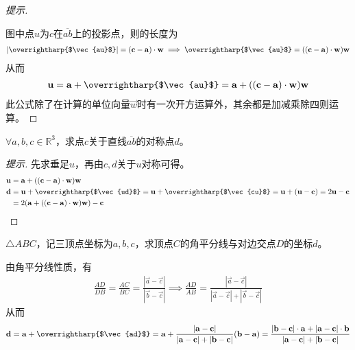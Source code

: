 \begin{proof}[提示]
\begin{center}
  \end{center}
  图中点$u$为$c$在$\overline{ab}$上的投影点，则的长度为
  \begin{align*}
    \left|\text{\overrightharp{$\vec{au}$}}\right| = (\vec c - \vec a)\cdot \vec w \implies
    \text{\overrightharp{$\vec{au}$}} = ((\vec c - \vec a)\cdot \vec w) \vec w
  \end{align*}
  从而
  \begin{align*}
    \vec u = \vec a + \text{\overrightharp{$\vec{au}$}} = \vec a + ((\vec c -\vec a)\cdot \vec w) \vec w
  \end{align*}
  此公式除了在计算的单位向量$\vec w$时有一次开方运算外，其余都是加减乘除四则运算。
\end{proof}


\begin{example}
  $\forall a, b, c\in\mathbb{R}^3$，求点$c$关于直线$\overline{ab}$的对称点$d$。
\end{example}
\begin{proof}[提示]
  先求垂足$u$，再由$c,d$关于$u$对称可得。
  \begin{align*}
    \vec u ={}& \vec a + ((\vec c -\vec a)\cdot \vec w) \vec w\\
    \vec d ={}& \vec u + \text{\overrightharp{$\vec{ud}$}} = \vec u + \text{\overrightharp{$\vec{cu}$}} = \vec u + (\vec u - \vec c) = 2\vec u - \vec c\\
           ={}& 2(\vec a + ((\vec c -\vec a)\cdot \vec w) \vec w) - \vec c \qedhere
  \end{align*}
\end{proof}

\begin{example}[角平分线]
  $\triangle ABC$，记三顶点坐标为$a,b,c$，求顶点$C$的角平分线与对边交点$D$的坐标$d$。

  由角平分线性质，有
  \begin{align*}
    \frac{AD}{DB}=\frac{AC}{BC}=\frac{\left|\vec a-\vec c\right|}{\left|\vec b-\vec c\right|}
    \implies
    \frac{AD}{AB} = \frac{\left|\vec a-\vec c\right|}{\left|\vec a-\vec c\right| + \left|\vec b-\vec c\right|}
  \end{align*}
  从而
  \begin{align*}
    \vec d={}\vec a + \text{\overrightharp{$\vec{ad}$}} = \vec a + \frac{\left|\vec a-\vec c\right|}{\left|\vec a-\vec c\right| + \left|\vec b-\vec c\right|}(\vec b - \vec a)
    ={} \frac{\left|\vec b-\vec c\right|\cdot \vec a + \left|\vec a-\vec c\right|\cdot \vec b}
              {\left|\vec a-\vec c\right| + \left|\vec b-\vec c\right|}
  \end{align*}
\end{example}

